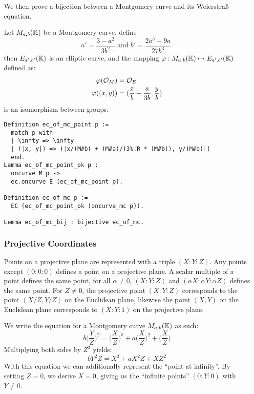 We then prove a bijection between a Montgomery curve and its Weierstra{\ss} equation.
\begin{lemma}
  Let $M_{a,b}(\mathbb{K})$ be a Montgomery curve, define $$a' = \frac{3-a^2}{3b^2} \text{\ \ \ \ and\ \ \ \ } b' = \frac{2a^3 - 9a}{27b^3}.$$
  then $E_{a',b'}(\mathbb{K})$ is an elliptic curve, and the mapping $\varphi : M_{a,b}(\mathbb{K}) \mapsto E_{a',b'}(\mathbb{K})$ defined as:
  \begin{align*}
    \varphi(\mathcal{O}_M) &= \mathcal{O}_E\\
    \varphi( (x , y) ) &= ( \frac{x}{b} + \frac{a}{3b} , \frac{y}{b} )
  \end{align*}
  is an isomorphism between groups.
\end{lemma}
\begin{lstlisting}[language=Coq]
Definition ec_of_mc_point p :=
  match p with
  | \infty => \infty
  | (|x, y|) => (|x/(M#b) + (M#a)/(3%:R * (M#b)), y/(M#b)|)
  end.
Lemma ec_of_mc_point_ok p :
  oncurve M p ->
  ec.oncurve E (ec_of_mc_point p).

Definition ec_of_mc p :=
  EC (ec_of_mc_point_ok (oncurve_mc p)).

Lemma ec_of_mc_bij : bijective ec_of_mc.
\end{lstlisting}

\subsubsection{Projective Coordinates}
\label{projective}
Points on a projective plane are represented with a triple $(X:Y:Z)$. Any points
except $(0:0:0)$ defines a point on a projective plane. A scalar multiple of a point defines the same point, \ie
for all $\alpha \neq 0$, $(X:Y:Z)$ and $(\alpha X:\alpha Y:\alpha Z)$ defines
the same point. For $Z\neq 0$, the projective point $(X:Y:Z)$ corresponds to the
point $(X/Z,Y/Z)$ on the Euclidean plane, likewise the point $(X,Y)$ on the Euclidean plane corresponds to $(X:Y:1)$ on the projective plane.

We write the equation for a Montgomery curve $M_{a,b}(\mathbb{K})$ as such:
\begin{equation}
b \bigg(\frac{Y}{Z}\bigg)^2 = \bigg(\frac{X}{Z}\bigg)^3 + a \bigg(\frac{X}{Z}\bigg)^2 + \bigg(\frac{X}{Z}\bigg)
\end{equation}
Multiplying both sides by $Z^3$ yields:
\begin{equation}
b Y^2Z = X^3 + a X^2Z + XZ^2
\end{equation}
With this equation we can additionally represent the ``point at infinity''. By
setting $Z=0$, we derive $X=0$, giving us the ``infinite points'' $(0:Y:0)$ with $Y\neq 0$.

